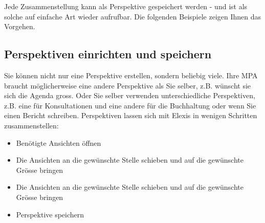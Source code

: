 Jede Zusammenstellung kann als Perspektive gespeichert werden - und ist als
solche auf einfache Art wieder aufrufbar. Die folgenden Beispiele
zeigen Ihnen das Vorgehen.

\subsection{Perspektiven einrichten und speichern}
Sie können nicht nur eine Perspektive erstellen, sondern beliebig viele. Ihre MPA braucht möglicherweise eine
andere Perspektive als Sie selber, z.B. wünscht sie sich die Agenda gross. Oder Sie selber verwenden unterschiedliche
Perspektiven, z.B. eine für Konsultationen und eine andere für die Buchhaltung oder wenn
Sie einen Bericht schreiben. Perspektiven lassen sich mit Elexis in wenigen Schritten zusammenstellen:
\begin{itemize}
 	\item Benötigte Ansichten öffnen
	\item Die Ansichten an die gewünschte Stelle schieben und auf die gewünschte Grösse bringen
	\item Die Ansichten an die gewünschte Stelle schieben und auf die gewünschte Grösse bringen
	\item Perspektive speichern

\end{itemize}
